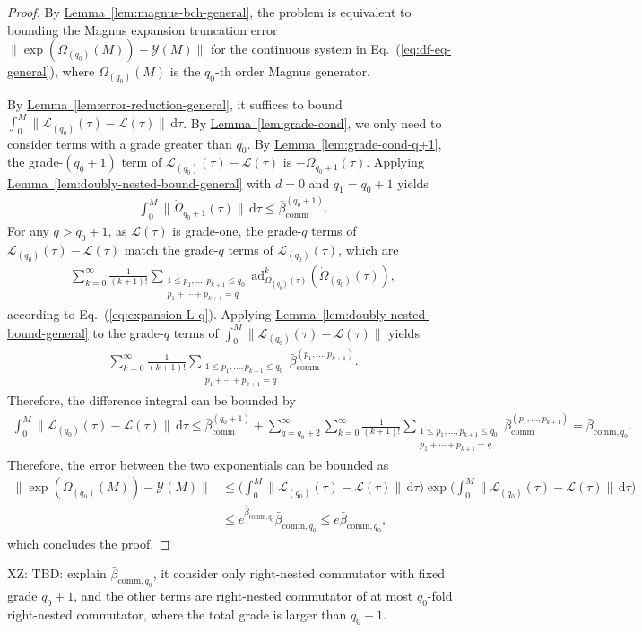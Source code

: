 \documentclass[11pt]{article}
\newcommand{\eq}[1]{(\ref{eq:#1})}
\newcommand{\lem}[1]{\hyperref[lem:#1]{Lemma~\ref*{lem:#1}}}
\renewcommand{\d}{\mathrm{d}}
\newcommand{\ad}{\mathrm{ad}}
\renewcommand{\comm}{\mathrm{comm}}
\newcommand{\mc}{\mathcal}
\newcommand{\xz}[1]{{\color{cyan} XZ: #1}}
\begin{document}
\begin{proof}
    By \lem{magnus-bch-general}, the problem is equivalent to bounding the Magnus expansion truncation error $\|\exp(\Omega_{(q_0)}(M)) - \mc Y(M)\|$ for the continuous system in Eq.~\eq{df-eq-general}, where $\Omega_{(q_0)}(M)$ is the $q_0$-th order Magnus generator. 

    By \lem{error-reduction-general}, it suffices to bound $\int_{0}^{M}\| \mc L_{(q_0)}(\tau)-\mc L(\tau)\|\,\d \tau$. By \lem{grade-cond}, we only need to consider terms with a grade greater than $q_0$. By \lem{grade-cond-q+1}, the grade-$(q_0+1)$ term of $\mc L_{(q_0)}(\tau)-\mc L(\tau)$ is $-\dot\Omega_{q_0+1}(\tau)$. Applying \lem{doubly-nested-bound-general} with $d = 0$ and $q_1 = q_0+1$ yields
    \begin{align*}
     \int_{0}^{M}\|\dot\Omega_{q_0+1}(\tau)\|\, \d \tau\le\bar{\beta}_{\comm}^{(q_0+1)}.
    \end{align*}
    For any $q>q_0+1$, as $\mc L(\tau)$ is grade-one, the grade-$q$ terms of $\mc L_{(q_0)}(\tau)-\mc L(\tau)$ match the grade-$q$ terms of $\mc L_{(q_0)}(\tau)$, which are
    \begin{align*}
        \sum_{k=0}^{\infty}\frac{1}{(k+1)!}\sum_{\substack{1\le p_1, \ldots, p_{k+1}\le q_0\\p_1+\cdots+p_{k+1}=q}}\ad_{\Omega_{(q_0)}(\tau)}^k(\dot{\Omega}_{(q_0)}(\tau)),
    \end{align*} 
    according to Eq.~\eq{expansion-L-q}. Applying \lem{doubly-nested-bound-general} to the grade-$q$ terms of $\int_{0}^M \|\mc L_{(q_0)}(\tau)-\mc L(\tau)\|$ yields 
    \begin{align*}
     \sum_{k=0}^{\infty}\frac{1}{(k+1)!}\sum_{\substack{1\le p_1, \ldots, p_{k+1}\le q_0\\p_1+\cdots+p_{k+1}=q}}\bar{\beta}_{\comm}^{(p_1, \ldots, p_{k+1})}.
    \end{align*}
    Therefore, the difference integral can be bounded by
    \begin{align*}
     \int_{0}^{M}\|\mc L_{(q_0)}(\tau)-\mc L(\tau)\|\,\d \tau\le \bar{\beta}_{\comm}^{(q_0+1)}+ \sum_{q = q_0+2}^{\infty} \sum_{k=0}^{\infty}\frac{1}{(k+1)!}\sum_{\substack{1\le p_1, \ldots, p_{k+1}\le q_0\\p_1+\cdots+p_{k+1}=q}}\bar{\beta}_{\comm}^{(p_1, \ldots, p_{k+1})} = \bar\beta_{\mathrm{comm}, q_0}.
    \end{align*}
    Therefore, the error between the two exponentials can be bounded as
    \begin{align*}
    \|\exp(\Omega_{(q_0)}(M))-\mc Y(M)\|&\le \bigg( \int_{0}^{M}\| \mc L_{(q_0)}(\tau)-\mc L(\tau)\|\,\d \tau\bigg)\exp\bigg(\int_{0}^{M}\| \mc L_{(q_0)}(\tau)-\mc L(\tau)\|\,\d \tau\bigg)\\
    &\le e^{\bar\beta_{\mathrm{comm}, q_0}}\bar\beta_{\mathrm{comm}, q_0} \le e\bar\beta_{\mathrm{comm}, q_0},
    \end{align*}
    which concludes the proof.
\end{proof}
\xz{TBD: explain $\bar\beta_{\mathrm{comm}, q_0}$, it consider only right-nested commutator with fixed grade $q_0+1$, and the other terms are right-nested commutator of at most $q_0$-fold right-nested commutator, where the total grade is larger than $q_0 + 1$.}
\end{document}

